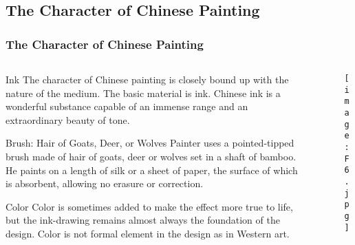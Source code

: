 \documentclass[pdflatex,compress,8pt,
	xcolor={dvipsnames,dvipsnames,svgnames,x11names,table},
	hyperref={	
	breaklinks = true, 
	pdfauthor={Lemenkova Polina}, 
	pdfsubject={Preentation}, 
	pdfcreator={Lemenkova Polina}, 
	pdfproducer={Lemenkova Polina}, 
	colorlinks=true,
	linkcolor=NavyBlue, 
	citecolor=NavyBlue, 
	urlcolor = NavyBlue, 
	breaklinks = true}]{beamer}
\begin{document}
\subsection{The Character of Chinese Painting}
\begin{frame}\frametitle{The Character of Chinese Painting}

	\begin{minipage}[0.4\textheight]{\textwidth}
		\begin{columns}[T]
			\begin{column}{0.5\textwidth}
	\small{
	\begin{alertblock}{Ink}
The character of Chinese painting is closely bound up with the nature of the medium. The basic material is ink. Chinese ink is a wonderful substance capable of an immense range and an extraordinary beauty of tone.
	\end{alertblock}

	\begin{block}{Brush: Hair of Goats, Deer, or Wolves}
Painter uses a pointed-tipped brush made of hair of goats, deer or wolves set in a shaft of bamboo. He paints on a length of silk or a sheet of paper, the surface of which is absorbent, allowing no erasure or correction.
	\end{block}

	\begin{alertblock}{Color}
Color is sometimes added to make the effect more true to life, but the ink-drawing remains almost always the foundation of the design. Color is not formal element in the design as in Western art.
	\end{alertblock}
	}
			\end{column}
			\begin{column}{0.5\textwidth}
\vspace{3em}
\begin{figure}[H]
	\centering
		\texttt{[image: F6.jpg]}
\end{figure}
			\end{column}
		\end{columns}
	\end{minipage}
\end{frame}
\end{document}
